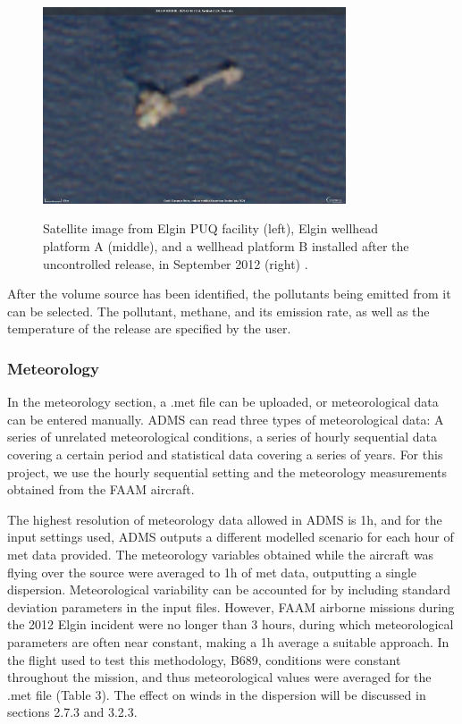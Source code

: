 \documentclass[12pt]{article}
\begin{document}
\begin{figure}[H]
\centering
\includegraphics[width=0.8\textwidth]{Plots/2023-07-08-00_00_2023-07-08-23_59_Sentinel-2_L2A_True_color.jpg}
\caption{\label{fig:Elgin satellite}} Satellite image from Elgin PUQ facility (left), Elgin wellhead platform A (middle), and a wellhead platform B installed after the uncontrolled release, in September 2012 (right) . 
\end{figure}

After the volume source has been identified, the pollutants being emitted from it can be selected. The pollutant, methane, and its emission rate, as well as the temperature of the release are specified by the user.  

\subsubsection{Meteorology}

In the meteorology section, a .met file can be uploaded, or meteorological data can be entered manually. ADMS can read three types of meteorological data: A series of unrelated meteorological conditions, a series of hourly sequential data covering a certain period and statistical data covering a series of years. For this project, we use the hourly sequential setting and the meteorology measurements obtained from the FAAM aircraft. 

The highest resolution of meteorology data allowed in ADMS is 1h, and for the input settings used, ADMS outputs a different modelled scenario for each hour of met data provided. The meteorology variables obtained while the aircraft was flying over the source were averaged to 1h of met data, outputting a single dispersion. Meteorological variability  can be accounted for by including standard deviation parameters in the input files. However, FAAM airborne missions during the 2012 Elgin incident were no longer than 3 hours, during which meteorological parameters are often near constant, making a 1h average a suitable approach. In the flight used to test this methodology, B689,  conditions were constant throughout the mission, and thus meteorological values were averaged for the .met file (Table 3). The effect on winds in the dispersion will be discussed in sections 2.7.3 and 3.2.3.
\end{document}
